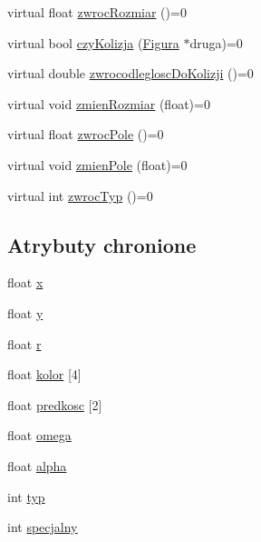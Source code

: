 \begin{DoxyCompactItemize}
\item 
virtual float \hyperlink{classFigura_aaeb587028aafd028e134079c249b0c88}{zwroc\-Rozmiar} ()=0
\item 
virtual bool \hyperlink{classFigura_a7a1cb0014aaaa276f8b17932c394b485}{czy\-Kolizja} (\hyperlink{classFigura}{Figura} $\ast$druga)=0
\item 
virtual double \hyperlink{classFigura_a3e534b43a279aeec36c5b28ac731e0f8}{zwrocodleglosc\-Do\-Kolizji} ()=0
\item 
virtual void \hyperlink{classFigura_a7ea2c8b450129878f4347404b8834c6b}{zmien\-Rozmiar} (float)=0
\item 
virtual float \hyperlink{classFigura_a78861f3fce7e615ba30b47aa1cdcebec}{zwroc\-Pole} ()=0
\item 
virtual void \hyperlink{classFigura_aad1198cc826aa6b3036454fd4f3bb5b3}{zmien\-Pole} (float)=0
\item 
virtual int \hyperlink{classFigura_ab04732de63f17d4c3776990d24897db7}{zwroc\-Typ} ()=0
\end{DoxyCompactItemize}
\subsection*{Atrybuty chronione}
\begin{DoxyCompactItemize}
\item 
float \hyperlink{classFigura_ad640a05ebb1ddbf595124f0b31793e8a}{x}
\item 
float \hyperlink{classFigura_ab17e5953f2898eb729b2dc506640bce2}{y}
\item 
float \hyperlink{classFigura_af4ea0a1b316060276b8cde2bc11ca190}{r}
\item 
float \hyperlink{classFigura_ab05a5e9bebed67a5d20d758999cd5d1a}{kolor} \mbox{[}4\mbox{]}
\item 
float \hyperlink{classFigura_a890207e032e201a3a75ab9680c90dec7}{predkosc} \mbox{[}2\mbox{]}
\item 
float \hyperlink{classFigura_a01436a48e3702376968890266d045dbe}{omega}
\item 
float \hyperlink{classFigura_a601361fbb05bc4dc3b9cab1a868b2910}{alpha}
\item 
int \hyperlink{classFigura_aa722cfdbd1f53bda5f8e8ad5bc7b824d}{typ}
\item 
int \hyperlink{classFigura_a4f37ab8e74deceecf994b1451413e482}{specjalny}
\end{DoxyCompactItemize}
